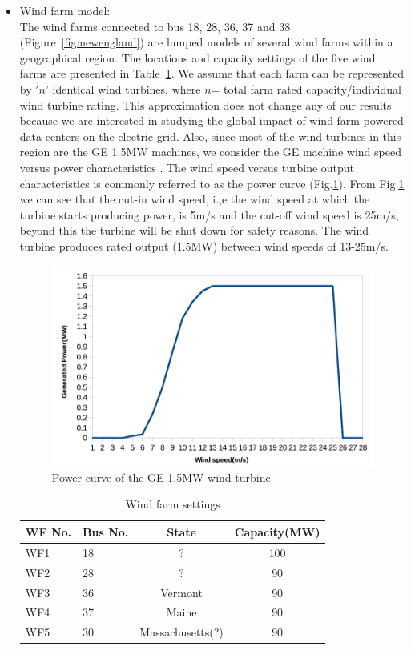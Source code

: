 \begin{itemize}
\item{Wind farm model: \\
The wind farms connected to bus 18, 28, 36, 37 and 38 (Figure~\ref{fig:newengland}) are lumped models of several wind farms within a geographical region. The locations and capacity settings of the five wind farms are presented in Table~\ref{tab:wf_setting}. We assume that each farm can be represented by $'n$' identical wind turbines, where $n$= total farm rated capacity/individual wind turbine rating. This approximation does not change any of our results because we are interested in studying the global impact of wind farm powered data centers on the electric grid. Also, since most of the wind turbines in this region are the GE 1.5MW machines, we consider the GE machine wind speed versus power characteristics \cite{lei2006modeling}. The wind speed versus turbine output characteristics is commonly referred to as the power curve (Fig.\ref{fig:windcurve}). From Fig.\ref{fig:windcurve} we can see that the cut-in wind speed, i.,e the wind speed at which the turbine starts producing power, is 5m/s and the cut-off wind speed is 25m/s, beyond this the turbine will be shut down for safety reasons. The wind turbine produces rated output (1.5MW) between wind speeds of 13-25m/s.
\begin{figure}[ht]
\centering
\includegraphics[width=1\columnwidth]{img/wind_curve.pdf}
\caption{Power curve of the GE 1.5MW wind turbine}
\label{fig:windcurve}
\end{figure}


\begin{table}[ht]
\begin{center}
\caption{Wind farm settings}
\begin{tabular}{|l|l|c|c|}
\hline
WF No. & Bus No. & State & Capacity(MW) \\
\hline
WF1 & 18& ? & 100\\
WF2 & 28& ? & 90 \\
WF3 & 36& Vermont & 90  \\
WF4 & 37& Maine & 90\\
WF5 & 30& Massachusetts(?) & 90\\
\hline

\end{tabular}
   \vspace{.05in}
\label{tab:wf_setting}
\end{center}
\end{table}
}
\end{itemize}
